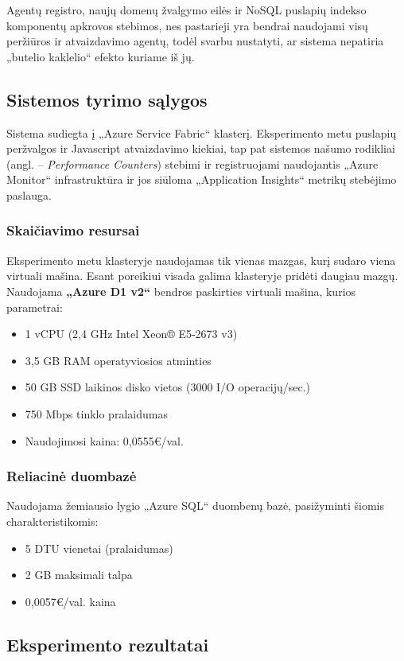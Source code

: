 Agentų registro, naujų domenų žvalgymo eilės ir NoSQL puslapių indekso komponentų apkrovos stebimos, nes pastarieji yra bendrai naudojami visų peržiūros ir atvaizdavimo agentų, todėl svarbu nustatyti, ar sistema nepatiria „butelio kaklelio“ efekto kuriame iš jų.

\subsection{Sistemos tyrimo sąlygos}

Sistema sudiegta į „Azure Service Fabric“ klasterį. Eksperimento metu puslapių peržvalgos ir Javascript atvaizdavimo kiekiai, tap pat sistemos našumo rodikliai (angl. -- \textit{Performance Counters}) stebimi ir registruojami naudojantis „Azure Monitor“ infrastruktūra ir jos siūloma „Application Insights“ metrikų stebėjimo paslauga.

\subsubsection{Skaičiavimo resursai}

Eksperimento metu klasteryje naudojamas tik vienas mazgas, kurį sudaro viena virtuali mašina. Esant poreikiui visada galima klasteryje pridėti daugiau mazgų. Naudojama \textbf{„Azure D1 v2“} bendros paskirties virtuali mašina, kurios parametrai:
\begin{itemize}
    \item 1 vCPU (2,4 GHz Intel Xeon® E5-2673 v3)
    \item 3,5 GB RAM operatyviosios atminties
    \item 50 GB SSD laikinos disko vietos (3000 I/O operacijų/sec.)
    \item 750 Mbps tinklo pralaidumas
    \item Naudojimosi kaina: 0,0555€/val.
\end{itemize}

\subsubsection{Reliacinė duombazė}

Naudojama žemiausio lygio „Azure SQL“ duombenų bazė, pasižyminti šiomis charakteristikomis:

\begin{itemize}
    \item 5 DTU vienetai (pralaidumas)
    \item 2 GB maksimali talpa
    \item 0,0057€/val. kaina
\end{itemize}

\subsection{Eksperimento rezultatai}

